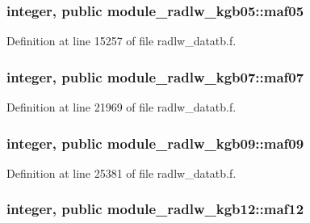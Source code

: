 \subsubsection[{\texorpdfstring{maf05}{maf05}}]{\setlength{\rightskip}{0pt plus 5cm}integer, public module\+\_\+radlw\+\_\+kgb05\+::maf05}\hypertarget{group__module__radlw__main_gaba904215976d7f4316b52c8f0cffe595}{}\label{group__module__radlw__main_gaba904215976d7f4316b52c8f0cffe595}


Definition at line 15257 of file radlw\+\_\+datatb.\+f.

\subsubsection[{\texorpdfstring{maf07}{maf07}}]{\setlength{\rightskip}{0pt plus 5cm}integer, public module\+\_\+radlw\+\_\+kgb07\+::maf07}\hypertarget{group__module__radlw__main_ga21ac454fe21fb07ee555b4106121b2ae}{}\label{group__module__radlw__main_ga21ac454fe21fb07ee555b4106121b2ae}


Definition at line 21969 of file radlw\+\_\+datatb.\+f.

\subsubsection[{\texorpdfstring{maf09}{maf09}}]{\setlength{\rightskip}{0pt plus 5cm}integer, public module\+\_\+radlw\+\_\+kgb09\+::maf09}\hypertarget{group__module__radlw__main_ga7d5d565c87af7ef07dc17930f9cb9e57}{}\label{group__module__radlw__main_ga7d5d565c87af7ef07dc17930f9cb9e57}


Definition at line 25381 of file radlw\+\_\+datatb.\+f.

\subsubsection[{\texorpdfstring{maf12}{maf12}}]{\setlength{\rightskip}{0pt plus 5cm}integer, public module\+\_\+radlw\+\_\+kgb12\+::maf12}\hypertarget{group__module__radlw__main_ga9d7c05182e21605108bd65f47bb5569c}{}\label{group__module__radlw__main_ga9d7c05182e21605108bd65f47bb5569c}


